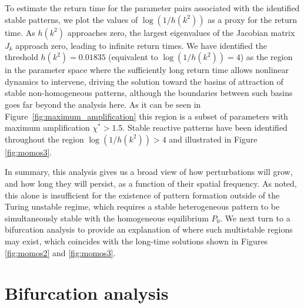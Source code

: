 \documentclass{article}
\newcommand{\jac}{J_{k}}
\begin{document}
 To estimate the return time for the parameter pairs associated with the identified stable patterns, we plot the values of \(\log\left(1/h(k^2)\right)\) as a proxy for the return time. As \(h(k^2)\) approaches zero, the largest eigenvalues of the Jacobian matrix \(\jac\) approach zero, leading to infinite return times. We have identified the threshold \(h(k^2) = 0.01835\) (equivalent to $\log\left(1/h(k^2)\right) = 4$) as the region in the parameter space where the sufficiently long return time allows nonlinear dynamics to intervene, driving the solution toward the basins of attraction of stable non-homogeneous patterns{, although the boundaries between such basins goes far beyond the analysis here}. As it can be seen in Figure~\ref{fig:maximum_amplification} this region is a subset of parameters with maximum amplification $\chi^*>1.5$. Stable reactive patterns have been identified throughout the region $\log\left(1/h(k^2)\right)> 4$ and illustrated in Figure \ref{fig:momos3}.

 In summary, this analysis gives us a broad view of how perturbations will grow, and how long they will persist, as a function of their spatial frequency. As noted, this alone is insufficient for the existence of pattern formation outside of the Turing unstable regime, which requires a stable heterogeneous pattern to be simultaneously stable with the homogeneous equilibrium $P_0$. We next turn to a bifurcation analysis to provide an explanation of where such multistable regions may exist, which coincides with the long-time solutions shown in Figures \ref{fig:momos2} and \ref{fig:momos3}.






\section{Bifurcation analysis}\label{Sec_continuation}


    
\end{document}
